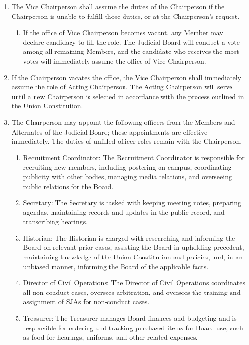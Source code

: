 \begin{enumerate}
\begin{enumerate}
\end{enumerate}
\item The Vice Chairperson shall assume the duties of the Chairperson if the Chairperson is unable to fulfill those duties, or at the Chairperson's request. 
\begin{enumerate}
    \item If the office of Vice Chairperson becomes vacant, any Member may declare candidacy to fill the role. The Judicial Board will conduct a vote among all remaining Members, and the candidate who receives the most votes will immediately assume the office of Vice Chairperson.
\end{enumerate}
\item If the Chairperson vacates the office, the Vice Chairperson shall immediately assume the role of Acting Chairperson. The Acting Chairperson will serve until a new Chairperson is selected in accordance with the process outlined in the Union Constitution.
\item The Chairperson may appoint the following officers from the Members and Alternates of the Judicial Board; these appointments are effective immediately. The duties of unfilled officer roles remain with the Chairperson.
\begin{enumerate}
    \item Recruitment Coordinator: The Recruitment Coordinator is responsible for recruiting new members, including postering on campus, coordinating publicity with other bodies, managing media relations, and overseeing public relations for the Board.
    \item Secretary: The Secretary is tasked with keeping meeting notes, preparing agendas, maintaining records and updates in the public record, and transcribing hearings.
    \item Historian: The Historian is charged with researching and informing the Board on relevant prior cases, assisting the Board in upholding precedent, maintaining knowledge of the Union Constitution and policies, and, in an unbiased manner, informing the Board of the applicable facts.
    \item Director of Civil Operations: The Director of Civil Operations coordinates all non-conduct cases, oversees arbitration, and oversees the training and assignment of SJAs for non-conduct cases.
    \item Treasurer: The Treasurer manages Board finances and budgeting and is responsible for ordering and tracking purchased items for Board use, such as food for hearings, uniforms, and other related expenses.

\end{enumerate}
\end{enumerate}
